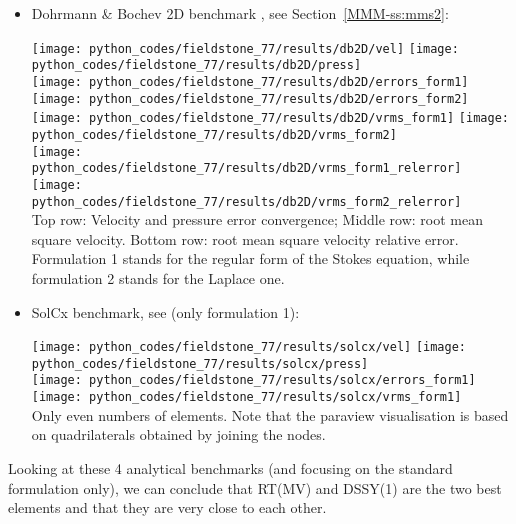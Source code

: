 \begin{itemize}
\item Dohrmann \& Bochev 2D benchmark \cite{dobo04,bodg06}, see Section~\ref{MMM-ss:mms2}:

\begin{center}
\texttt{[image: python\_codes/fieldstone\_77/results/db2D/vel]}
\texttt{[image: python\_codes/fieldstone\_77/results/db2D/press]}\\
\texttt{[image: python\_codes/fieldstone\_77/results/db2D/errors\_form1]}
\texttt{[image: python\_codes/fieldstone\_77/results/db2D/errors\_form2]}\\
\texttt{[image: python\_codes/fieldstone\_77/results/db2D/vrms\_form1]}
\texttt{[image: python\_codes/fieldstone\_77/results/db2D/vrms\_form2]}\\
\texttt{[image: python\_codes/fieldstone\_77/results/db2D/vrms\_form1\_relerror]}
\texttt{[image: python\_codes/fieldstone\_77/results/db2D/vrms\_form2\_relerror]}\\
{\captionfont Top row: Velocity and pressure error convergence; 
Middle row: root mean square velocity. 
Bottom row: root mean square velocity relative error.
Formulation 1 stands for the regular form of the 
Stokes equation, while formulation 2 stands for the Laplace one.}
\end{center}

\item SolCx benchmark, see  (only formulation 1):

\begin{center}
\texttt{[image: python\_codes/fieldstone\_77/results/solcx/vel]}
\texttt{[image: python\_codes/fieldstone\_77/results/solcx/press]}\\
\texttt{[image: python\_codes/fieldstone\_77/results/solcx/errors\_form1]}
\texttt{[image: python\_codes/fieldstone\_77/results/solcx/vrms\_form1]}\\
{\captionfont Only even numbers of elements. Note that the paraview visualisation is based on 
quadrilaterals obtained by joining the nodes.}
\end{center}

\end{itemize}

Looking at these 4 analytical benchmarks (and focusing on the standard formulation only), 
we can conclude that RT(MV) and DSSY(1) are the two best elements and that they are very close to 
each other.

